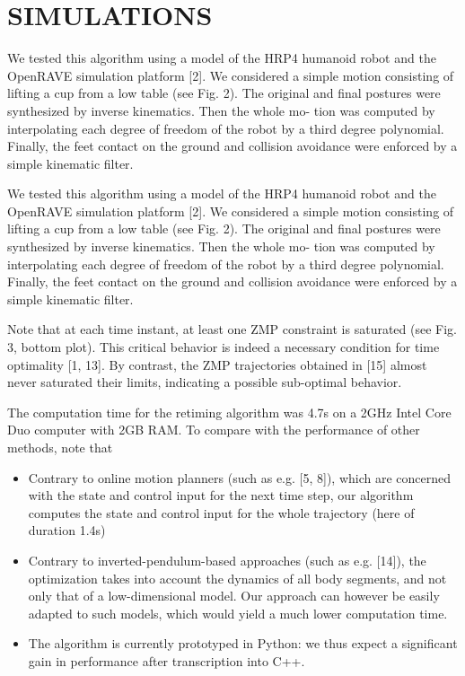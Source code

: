 \documentclass[journal]{IEEEtran}
\begin{document}
\section{SIMULATIONS}
We tested this algorithm using a model of the HRP4
humanoid robot and the OpenRAVE simulation platform [2].
We considered a simple motion consisting of lifting a cup
from a low table (see Fig. 2). The original and final postures
were synthesized by inverse kinematics. Then the whole mo-
tion was computed by interpolating each degree of freedom
of the robot by a third degree polynomial. Finally, the feet
contact on the ground and collision avoidance were enforced
by a simple kinematic filter.

We tested this algorithm using a model of the HRP4
humanoid robot and the OpenRAVE simulation platform [2].
We considered a simple motion consisting of lifting a cup
from a low table (see Fig. 2). The original and final postures
were synthesized by inverse kinematics. Then the whole mo-
tion was computed by interpolating each degree of freedom
of the robot by a third degree polynomial. Finally, the feet
contact on the ground and collision avoidance were enforced
by a simple kinematic filter.

Note that at each time instant, at least one ZMP constraint
is saturated (see Fig. 3, bottom plot). This critical behavior
is indeed a necessary condition for time optimality [1, 13].
By contrast, the ZMP trajectories obtained in [15] almost
never saturated their limits, indicating a possible sub-optimal
behavior.

The computation time for the retiming algorithm was 4.7s
on a 2GHz Intel Core Duo computer with 2GB RAM. To
compare with the performance of other methods, note that

\begin{itemize}
\item Contrary to online motion planners (such as e.g. [5, 8]),
which are concerned with the state and control input for
the next time step, our algorithm computes the state and
control input for the whole trajectory (here of duration
1.4s)
\item Contrary to inverted-pendulum-based approaches (such
as e.g. [14]), the optimization takes into account the
dynamics of all body segments, and not only that of
a low-dimensional model. Our approach can however
be easily adapted to such models, which would yield a
much lower computation time.
\item The algorithm is currently prototyped in Python: we
thus expect a significant gain in performance after
transcription into C++.
\end{itemize}
\end{document}
